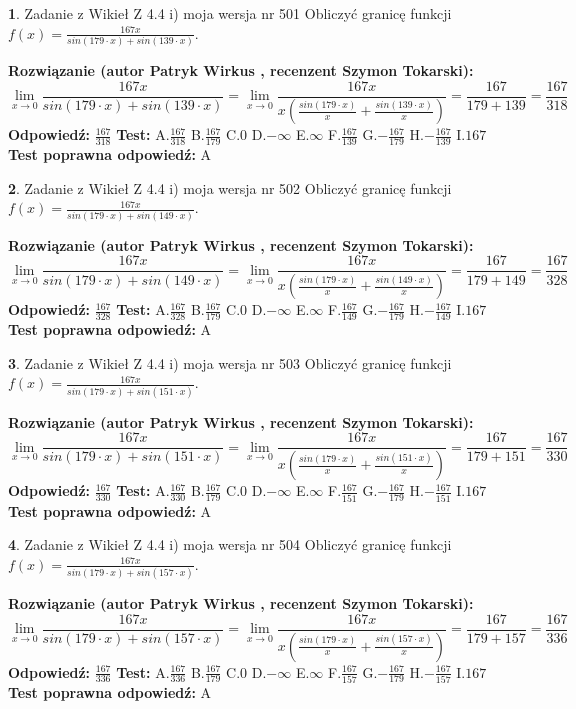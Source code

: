 \documentclass[12pt, a4paper]{article}
\theoremstyle{definition} %
\newtheorem{zad}{}
\newcommand{\zadStart}[1]{\begin{zad}#1\newline}
\newcommand{\zadStop}{\end{zad}}
\newcommand{\rozwStart}[2]{\noindent \textbf{Rozwiązanie (autor #1 , recenzent #2): }\newline}
\newcommand{\rozwStop}{\newline}
\newcommand{\odpStart}{\noindent \textbf{Odpowiedź:}\newline}
\newcommand{\odpStop}{\newline}
\newcommand{\testStart}{\noindent \textbf{Test:}\newline}
\newcommand{\testStop}{\newline}
\newcommand{\kluczStart}{\noindent \textbf{Test poprawna odpowiedź:}\newline}
\newcommand{\kluczStop}{\newline}
\begin{document}
\zadStart{Zadanie z Wikieł Z 4.4 i) moja wersja nr 501}
Obliczyć granicę funkcji $f(x)=\frac{167x}{sin(179\cdot x) +sin(139\cdot x)}$.
\zadStop
\rozwStart{Patryk Wirkus}{Szymon Tokarski}
$$\lim\limits_{x\to 0}\frac{167x}{sin(179\cdot x) +sin(139\cdot x)}=\lim\limits_{x\to 0}\frac{167x}{x(\frac{sin(179\cdot x)}{x}+\frac{sin(139\cdot x)}{x})}=\frac{167}{179+139} = \frac{167}{318}$$
\rozwStop
\odpStart
$\frac{167}{318}$
\odpStop
\testStart
A.$\frac{167}{318}$
B.$\frac{167}{179}$
C.$0$
D.$-\infty$
E.$\infty$
F.$\frac{167}{139}$
G.$-\frac{167}{179}$
H.$-\frac{167}{139}$
I.$167$
\testStop
\kluczStart
A
\kluczStop



\zadStart{Zadanie z Wikieł Z 4.4 i) moja wersja nr 502}
Obliczyć granicę funkcji $f(x)=\frac{167x}{sin(179\cdot x) +sin(149\cdot x)}$.
\zadStop
\rozwStart{Patryk Wirkus}{Szymon Tokarski}
$$\lim\limits_{x\to 0}\frac{167x}{sin(179\cdot x) +sin(149\cdot x)}=\lim\limits_{x\to 0}\frac{167x}{x(\frac{sin(179\cdot x)}{x}+\frac{sin(149\cdot x)}{x})}=\frac{167}{179+149} = \frac{167}{328}$$
\rozwStop
\odpStart
$\frac{167}{328}$
\odpStop
\testStart
A.$\frac{167}{328}$
B.$\frac{167}{179}$
C.$0$
D.$-\infty$
E.$\infty$
F.$\frac{167}{149}$
G.$-\frac{167}{179}$
H.$-\frac{167}{149}$
I.$167$
\testStop
\kluczStart
A
\kluczStop



\zadStart{Zadanie z Wikieł Z 4.4 i) moja wersja nr 503}
Obliczyć granicę funkcji $f(x)=\frac{167x}{sin(179\cdot x) +sin(151\cdot x)}$.
\zadStop
\rozwStart{Patryk Wirkus}{Szymon Tokarski}
$$\lim\limits_{x\to 0}\frac{167x}{sin(179\cdot x) +sin(151\cdot x)}=\lim\limits_{x\to 0}\frac{167x}{x(\frac{sin(179\cdot x)}{x}+\frac{sin(151\cdot x)}{x})}=\frac{167}{179+151} = \frac{167}{330}$$
\rozwStop
\odpStart
$\frac{167}{330}$
\odpStop
\testStart
A.$\frac{167}{330}$
B.$\frac{167}{179}$
C.$0$
D.$-\infty$
E.$\infty$
F.$\frac{167}{151}$
G.$-\frac{167}{179}$
H.$-\frac{167}{151}$
I.$167$
\testStop
\kluczStart
A
\kluczStop



\zadStart{Zadanie z Wikieł Z 4.4 i) moja wersja nr 504}
Obliczyć granicę funkcji $f(x)=\frac{167x}{sin(179\cdot x) +sin(157\cdot x)}$.
\zadStop
\rozwStart{Patryk Wirkus}{Szymon Tokarski}
$$\lim\limits_{x\to 0}\frac{167x}{sin(179\cdot x) +sin(157\cdot x)}=\lim\limits_{x\to 0}\frac{167x}{x(\frac{sin(179\cdot x)}{x}+\frac{sin(157\cdot x)}{x})}=\frac{167}{179+157} = \frac{167}{336}$$
\rozwStop
\odpStart
$\frac{167}{336}$
\odpStop
\testStart
A.$\frac{167}{336}$
B.$\frac{167}{179}$
C.$0$
D.$-\infty$
E.$\infty$
F.$\frac{167}{157}$
G.$-\frac{167}{179}$
H.$-\frac{167}{157}$
I.$167$
\testStop
\kluczStart
A
\kluczStop
\end{document}
